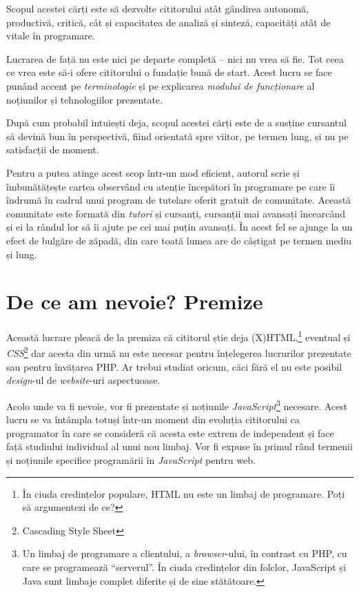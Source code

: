 Scopul acestei cărți este să dezvolte cititorului atât gândirea autonomă,
productivă, critică, cât și capacitatea de analiză și sinteză, capacități atât
de vitale în programare.

Lucrarea de față nu este nici pe departe completă -- nici nu vrea să fie.  Tot
ceea ce vrea este să-i ofere cititorului o fundație bună de start. Acest lucru
se face punând accent pe \textit{terminologie} și pe explicarea \textit{modului
de funcționare} al noțiunilor și tehnologiilor prezentate.

După cum probabil intuiești deja, scopul acestei cărți este de a susține
cursantul să devină bun în perspectivă, fiind orientată spre viitor, pe termen
lung, și nu pe satisfacții de moment.

Pentru a putea atinge acest scop într-un mod eficient, autorul scrie și
îmbunătățește cartea observând cu atenție începători în programare pe care îi
îndrumă în cadrul unui program de tutelare oferit gratuit de comunitate.
Această comunitate este formată din \textit{tutori} și cursanți, cursanții mai
avansați încearcând și ei la rândul lor să îi ajute pe cei mai puțin avansați.
În acest fel se ajunge la un efect de bulgăre de zăpadă, din care toată lumea
are de câștigat pe termen mediu și lung.

\section*{De ce am nevoie? Premize}
{}

Această lucrare pleacă de la premiza că cititorul știe deja
(X)HTML,\footnote{În ciuda credințelor populare, HTML nu este un limbaj de
programare. Poți să argumentezi de ce?} eventual și
\textsl{CSS}\footnote{Cascading Style Sheet}
%
%
%
%
dar acesta din urmă nu este necesar pentru
înțelegerea lucrurilor prezentate sau pentru învățarea PHP. Ar trebui studiat
oricum, căci fără el nu este posibil
\textsl{design}-ul
%
%
de \textit{website}-uri aspectuoase.

Acolo unde va fi nevoie, vor fi prezentate și noțiunile
\textsl{JavaScript}\footnote{Un
limbaj de programare a clientului, a \textsl{browser}-ului, în contrast cu PHP,
cu care se programează ``serverul''.  În ciuda credințelor din folclor,
JavaScript și Java sunt limbaje complet diferite și de sine stătătoare.}
necesare. Acest lucru se va întâmpla totuși într-un moment din evoluția
cititorului ca programator în care se consideră că acesta este extrem de
independent și face față studiului individual al unui nou limbaj. Vor fi expuse
în primul rând termenii și noțiunile specifice programării în \textit{JavaScript} pentru
web.

